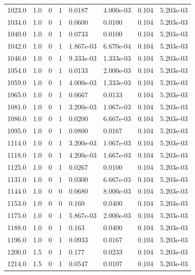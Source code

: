 \documentclass[preview]{standalone}
\begin{document}
{{{{\begin{tabular}{L{1.2cm}C{1.2cm} C{0.3cm}C{0.5cm} C{1.4cm}C{1.4cm} C{1.4cm}C{1.4cm}}
  1023.0  &   1.0  & 0     &  1 &  0.0187  & 4.000e-03  & 0.104 &  5.203e-03   \\ 
  1034.0  &   1.0  & 0     &  1 &  0.0600  & 0.0100  & 0.104 &  5.203e-03   \\ 
  1040.0  &   1.0  & 0     &  1 &  0.0733  & 0.0100  & 0.104 &  5.203e-03   \\ 
  1042.0  &   1.0  & 0     &  1 &  1.867e-03  & 6.670e-04  & 0.104 &  5.203e-03   \\ 
  1046.0  &   1.0  & 0     &  1 &  9.333e-03  & 1.333e-03  & 0.104 &  5.203e-03   \\ 
  1054.0  &   1.0  & 0     &  1 &  0.0133  & 2.000e-03  & 0.104 &  5.203e-03   \\ 
  1059.0  &   1.0  & 0     &  1 &  4.000e-03  & 1.333e-03  & 0.104 &  5.203e-03   \\ 
  1065.0  &   1.0  & 0     &  1 &  0.0667  & 0.0133  & 0.104 &  5.203e-03   \\ 
  1081.0  &   1.0  & 0     &  1 &  3.200e-03  & 1.067e-03  & 0.104 &  5.203e-03   \\ 
  1086.0  &   1.0  & 0     &  1 &  0.0200  & 6.667e-03  & 0.104 &  5.203e-03   \\ 
  1095.0  &   1.0  & 0     &  1 &  0.0800  & 0.0167  & 0.104 &  5.203e-03   \\ 
  1114.0  &   1.0  & 0     &  1 &  3.200e-03  & 1.067e-03  & 0.104 &  5.203e-03   \\ 
  1118.0  &   1.0  & 0     &  1 &  4.200e-03  & 1.667e-03  & 0.104 &  5.203e-03   \\ 
  1125.0  &   1.0  & 0     &  1 &  0.0267  & 0.0100  & 0.104 &  5.203e-03   \\ 
  1131.0  &   1.0  & 0     &  1 &  0.0300  & 6.667e-03  & 0.104 &  5.203e-03   \\ 
  1144.0  &   1.0  & 0     &  0 &  0.0680  & 8.000e-03  & 0.104 &  5.203e-03   \\ 
  1153.0  &   1.0  & 0     &  0 &  0.160  & 0.0400  & 0.104 &  5.203e-03   \\ 
  1175.0  &   1.0  & 0     &  1 &  5.867e-03  & 2.000e-03  & 0.104 &  5.203e-03   \\ 
  1188.0  &   1.0  & 0     &  1 &  0.163  & 0.0400  & 0.104 &  5.203e-03   \\ 
  1196.0  &   1.0  & 0     &  1 &  0.0933  & 0.0167  & 0.104 &  5.203e-03   \\ 
  1200.0  &   1.5  & 0     &  1 &  0.177  & 0.0233  & 0.104 &  5.203e-03   \\ 
  1214.0  &   1.5  & 0     &  1 &  0.0547  & 0.0107  & 0.104 &  5.203e-03   \\ 

\end{tabular}}}}}
\end{document}
